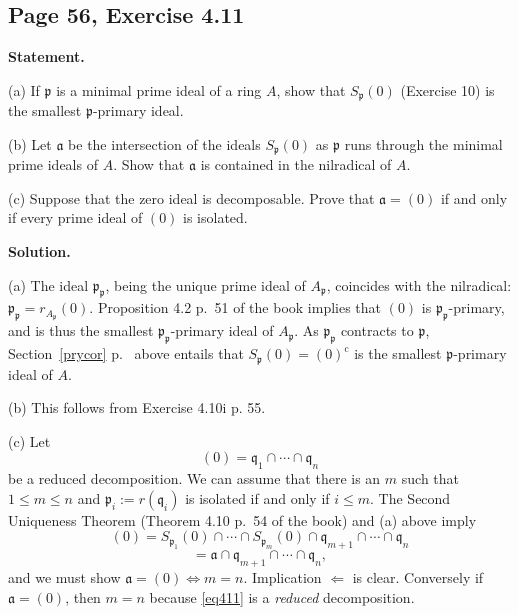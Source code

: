 \documentclass[parskip=half,fontsize=12pt]{scrartcl}%
\newcommand{\oo}{\operatorname}\newcommand{\ooo}{\operatorname*}
\newcommand{\mf}{\mathfrak}
\newcommand{\aaa}{\mf a}
\newcommand{\ppp}{\mf p}
\newcommand{\qqq}{\mf q}
\begin{document}
\subsection{Page 56, Exercise 4.11}\label{411}%

\textbf{Statement.} 

(a) If $\ppp$ is a minimal prime ideal of a ring $A$, show that $S_\ppp(0)$ (Exercise 10) is the smallest $\ppp$-primary ideal.

(b) Let $\aaa$ be the intersection of the ideals $S_\ppp(0)$ as  $\ppp$ runs through the minimal prime ideals of $A$. Show that $\aaa$ is contained in the nilradical of $A$.

(c) Suppose that the zero ideal is decomposable. Prove that $\aaa=(0)$ if and only if every prime ideal of $(0)$ is isolated.

\textbf{Solution.}

(a) The ideal $\ppp_\ppp$, being the unique prime ideal of $A_\ppp$, coincides with the nilradical: $\ppp_\ppp=r_{A_\ppp}(0)$. Proposition 4.2 p.~51 of the book implies that $(0)$ is $\ppp_\ppp$-primary, and is thus the smallest $\ppp_\ppp$-primary ideal of $A_\ppp$. As $\ppp_\ppp$ contracts to $\ppp$, Section~\ref{prycor} p.~\pageref{prycor} above entails that $S_\ppp(0)=(0)^{\oo c}$ is the smallest $\ppp$-primary ideal of $A$. %

(b) This follows from Exercise 4.10i p. 55.

(c) Let 
$$
(0)=\qqq_1\cap\cdots\cap\qqq_n
$$ 
be a reduced decomposition. We can assume that there is an $m$ such that $1\le m\le n$ and $\ppp_i:=r(\qqq_i)$ is isolated if and only if $i\le m$. The Second Uniqueness Theorem (Theorem 4.10 p.~54 of the book) and (a) above imply 
\begin{equation}\label{eq411}
(0)=S_{\ppp_1}(0)\cap\cdots\cap S_{\ppp_m}(0)\cap\qqq_{m+1}\cap\cdots\cap\qqq_n
\end{equation} 
$$
=\aaa\cap\qqq_{m+1}\cap\cdots\cap\qqq_n,
$$ 
and we must show $\aaa=(0)\iff m=n$. Implication $\Longleftarrow$ is clear. Conversely if $\aaa=(0)$, then $m=n$ because \eqref{eq411} is a \emph{reduced} decomposition.
\end{document}
